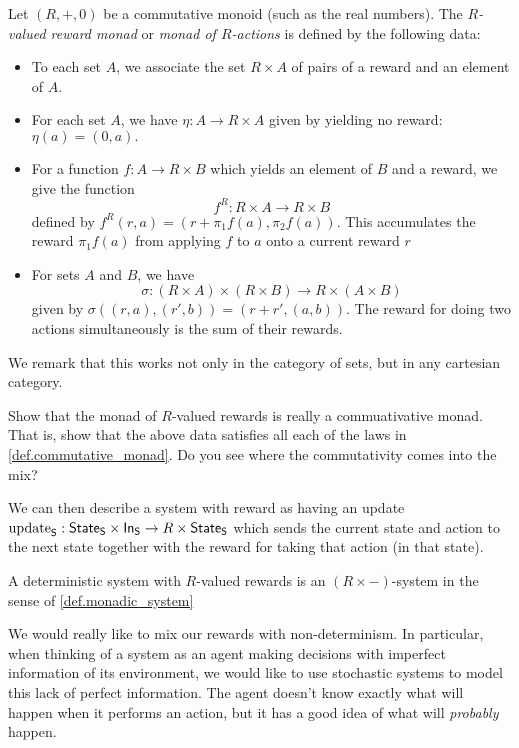 \documentclass[DynamicalBook]{subfiles}
\begin{document}
\begin{definition}
Let $(R, +, 0)$ be a commutative monoid (such as the real numbers). The
\emph{$R$-valued reward monad} or \emph{monad of $R$-actions} is defined by the
following data:
\begin{itemize}
  \item To each set $A$, we associate the set $R \times A$ of pairs of a reward
    and an element of $A$.
  \item For each set $A$, we have $\eta : A \to R \times A$ given by yielding
    no reward:
    $\eta(a) = (0, a).$
  \item For a function $f : A \to R \times B$ which yields an element of $B$ and
    a reward, we give the function
    \[
      f^R : R \times A \to R \times B
    \]
 defined by $f^R(r, a) = (r + \pi_1f(a), \pi_2f(a))$. This accumulates the
 reward $\pi_1f(a)$ from applying $f$ to $a$ onto a current reward $r$
\item For sets $A$ and $B$, we have
  \[
\sigma : (R \times A) \times (R \times B) \to R \times (A \times B)
\]
given by $\sigma((r, a), (r', b)) = (r + r', (a, b))$. The reward for doing two
actions simultaneously is the sum of their rewards.
  \end{itemize}
  
We remark that this works not only in the category of sets, but in any cartesian category.
\end{definition}

\begin{exercise}
  Show that the monad of $R$-valued rewards is really a commuativative monad.
  That is, show that the above data satisfies all each of the laws in
  \cref{def.commutative_monad}. Do you see where the commutativity comes into
  the mix?
\end{exercise}

We can then describe a system with reward as having an update $\mathrm{update}_{\mathsf{S}} :
\mathsf{State}_{\mathsf{S}} \times \mathsf{In}_{\mathsf{S}} \to R \times \mathsf{State}_{\mathsf{S}}$ which sends the current state
and action to the next state together with the reward for taking that action (in
that state).

\begin{definition}
A deterministic system with $R$-valued rewards is an $(R \times -)$-system in
the sense of \cref{def.monadic_system}
\end{definition}

We would really like to mix our rewards with non-determinism. In particular,
when thinking of a system as an agent making decisions with imperfect
information of its environment, we would like to use stochastic systems to model
this lack of perfect information. The agent doesn't know exactly what will
happen when it performs an action, but it has a good idea of what will
\emph{probably} happen.
\end{document}
